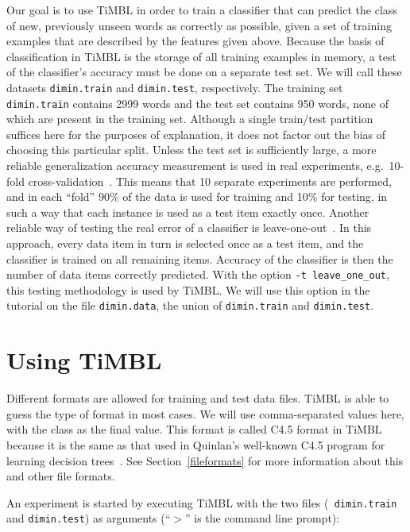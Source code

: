 \documentclass{book}
\begin{document}
Our goal is to use TiMBL in order to train a classifier that can
predict the class of new, previously unseen words as correctly as
possible, given a set of training examples that are described by the
features given above. Because the basis of classification in TiMBL is
the storage of all training examples in memory, a test of the
classifier's accuracy must be done on a separate test set. We will
call these datasets {\tt dimin.train} and {\tt dimin.test},
respectively. The training set {\tt dimin.train} contains 2999 words
and the test set contains 950 words, none of which are present in the
training set. Although a single train/test partition suffices here for
the purposes of explanation, it does not factor out the bias of
choosing this particular split. Unless the test set is sufficiently
large, a more reliable generalization accuracy measurement is used in
real experiments, e.g.~10-fold cross-validation~\cite{Weiss+91}. This
means that 10 separate experiments are performed, and in each ``fold''
90\% of the data is used for training and 10\% for testing, in such a
way that each instance is used as a test item exactly once. Another
reliable way of testing the real error of a classifier is
leave-one-out~\cite{Weiss+91}. In this approach, every data item in
turn is selected once as a test item, and the classifier is trained on
all remaining items. Accuracy of the classifier is then the number of
data items correctly predicted. With the option {\tt -t
leave\_one\_out}, this testing methodology is used by TiMBL. We
will use this option in the tutorial on the file {\tt dimin.data}, the
union of {\tt dimin.train} and {\tt dimin.test}. 

\section{Using TiMBL}

Different formats are allowed for training and test data files. TiMBL
is able to guess the type of format in most cases. We will use
comma-separated values here, with the class as the final value. This
format is called C4.5 format in TiMBL because it is the same as that
used in Quinlan's well-known C4.5 program for learning decision
trees~\cite{Quinlan93}. See Section~\ref{fileformats} for more
information about this and other file formats.

An experiment is started by executing TiMBL with the two files ({\tt
  dimin.train} and {\tt dimin.test}) as arguments (``$>$'' is the
command line prompt):
\end{document}
